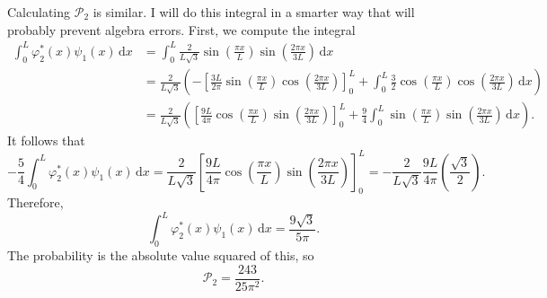 \documentclass[11pt, letterpaper]{article}
\begin{document}
\begin{enumerate}
		Calculating $\mathcal{P} _2$ is similar. I will do this integral in a smarter way that will probably prevent algebra errors. First, we compute the integral
		\begin{align*}
			\int_{0}^{L} \varphi_2^*(x)\psi _1(x) \,\mathrm{d} x&=\int_{0}^{L} \frac{2}{L\sqrt{3} } \sin \left( \frac{\pi x}{L}  \right) \sin \left( \frac{2\pi x}{3L}  \right)  \,\mathrm{d} x\\
									    &=\frac{2}{L\sqrt{3} } \left( -\left[ \frac{3L}{2\pi } \sin \left( \frac{\pi x}{L}  \right) \cos \left( \frac{2\pi x}{3L}  \right)  \right]_0^L+\int_{0}^{L} \frac{3}{2}\cos \left( \frac{\pi x}{L}  \right) \cos \left( \frac{2\pi x}{3L}  \right)  \,\mathrm{d} x \right) \\
									    &=\frac{2}{L\sqrt{3} } \left( \left[ \frac{9L}{4\pi } \cos \left( \frac{\pi x}{L}  \right) \sin \left( \frac{2\pi x}{3L}  \right)  \right]_0^L+\frac{9}{4} \int_{0}^{L} \sin \left( \frac{\pi x}{L}  \right) \sin \left( \frac{2\pi x}{3L}  \right)  \,\mathrm{d} x \right) 
		.\end{align*}
		It follows that
		\[
			-\frac{5}{4} \int_{0}^{L} \varphi _2^*(x)\psi _1(x) \,\mathrm{d} x=\frac{2}{L\sqrt{3} } \left[ \frac{9L}{4\pi } \cos \left( \frac{\pi x}{L}  \right) \sin \left( \frac{2\pi x}{3L}  \right)  \right]_0^L=-\frac{2}{L\sqrt{3} } \frac{9L}{4\pi } \left( \frac{\sqrt{3} }{2}  \right) 
		.\]
		Therefore,
		\[
			\int_{0}^{L} \varphi _2^*(x)\psi_1 (x) \,\mathrm{d} x=\frac{9\sqrt{3} }{5\pi } 
		.\]
		The probability is the absolute value squared of this, so
		\[
			\mathcal{P}_2=\frac{243}{25\pi ^2} 
		.\]
\end{enumerate}
\end{document}
